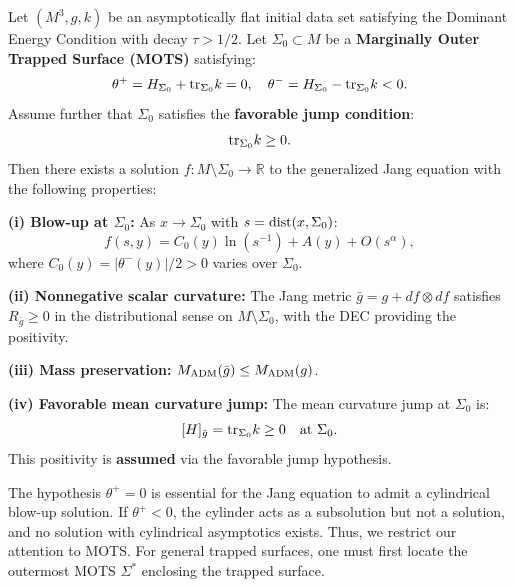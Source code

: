 
\begin{theorem}\label{thm:DirectTrappedJang-detailed}\label{thm:DirectTrappedJang}
Let $(M^3, g, k)$ be an asymptotically flat initial data set satisfying the Dominant Energy Condition with decay $\tau > 1/2$. Let $\Sigma_0 \subset M$ be a \textbf{Marginally Outer Trapped Surface (MOTS)} satisfying:
\[
    \theta^+ = H_{\Sigma_0} + \mathrm{tr}_{\Sigma_0} k = 0, \quad \theta^- = H_{\Sigma_0} - \mathrm{tr}_{\Sigma_0} k < 0.
\]
Assume further that $\Sigma_0$ satisfies the \textbf{favorable jump condition}:
\[
    \mathrm{tr}_{\Sigma_0} k \ge 0.
\]
Then there exists a solution $f: M \setminus \Sigma_0 \to \mathbb{R}$ to the generalized Jang equation with the following properties:

\textbf{(i) Blow-up at $\Sigma_0$:} As $x \to \Sigma_0$ with $s = \mathrm{dist}(x, \Sigma_0)$:
\[
    f(s, y) = C_0(y) \ln(s^{-1}) + A(y) + O(s^\alpha),
\]
where $C_0(y) = |\theta^-(y)|/2 > 0$ varies over $\Sigma_0$.

\textbf{(ii) Nonnegative scalar curvature:} The Jang metric $\bar{g} = g + df \otimes df$ satisfies $R_{\bar{g}} \ge 0$ in the distributional sense on $M \setminus \Sigma_0$, with the DEC providing the positivity.

\textbf{(iii) Mass preservation:} $M_{\mathrm{ADM}}(\bar{g}) \le M_{\mathrm{ADM}}(g)$.

\textbf{(iv) Favorable mean curvature jump:} The mean curvature jump at $\Sigma_0$ is:
\[
    [H]_{\bar{g}} = \mathrm{tr}_{\Sigma_0} k \ge 0 \quad \text{at } \Sigma_0.
\]
This positivity is \textbf{assumed} via the favorable jump hypothesis.
\end{theorem}

\begin{remark}\label{rem:FutureTrappedCondition}
The hypothesis $\theta^+ = 0$ is essential for the Jang equation to admit a cylindrical blow-up solution. If $\theta^+ < 0$, the cylinder acts as a subsolution but not a solution, and no solution with cylindrical asymptotics exists. Thus, we restrict our attention to MOTS. For general trapped surfaces, one must first locate the outermost MOTS $\Sigma^*$ enclosing the trapped surface.
\end{remark}

